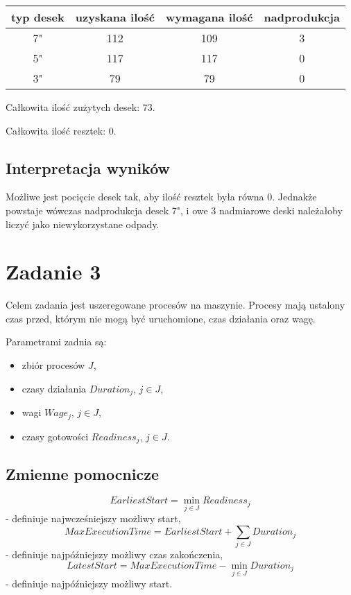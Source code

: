 \documentclass[polish,12pt,titlepage]{article}
\begin{document}
\begin{tabular}{ | c | c | c | c | }
	\hline
	typ desek & uzyskana ilość & wymagana ilość & nadprodukcja \\
	\hline
	7" & 112 & 109 & 3 \\
	5" & 117 & 117 & 0 \\
	3" & 79  & 79  & 0 \\
	\hline
\end{tabular}

Całkowita ilość zużytych desek: $73$.

Całkowita ilość resztek: $0$.



\subsection{Interpretacja wyników}

Możliwe jest pocięcie desek tak, aby ilość resztek była równa 0. Jednakże powstaje wówczas nadprodukcja desek 7", i owe 3 nadmiarowe deski należałoby liczyć jako niewykorzystane odpady.

\section{Zadanie 3}

Celem zadania jest uszeregowane procesów na maszynie. Procesy mają ustalony czas przed, którym nie mogą być uruchomione, czas działania oraz wagę.

Parametrami zadnia są:
\begin{itemize}
	\item zbiór procesów $J$,
	\item czasy działania $Duration_j$, $j \in J$,
	\item wagi $Wage_j$, $j \in J$,
	\item czasy gotowości $Readiness_j$, $j \in J$.
\end{itemize}

\subsection{Zmienne pomocnicze}

$$EarliestStart = \min_{j \in J} Readiness_j$$ - definiuje najwcześniejszy możliwy start,
$$MaxExecutionTime = EarliestStart + \sum\limits_{j \in J} Duration_j$$ - definiuje najpóźniejszy możliwy czas zakończenia,
$$LatestStart = MaxExecutionTime - \min_{j \in J} Duration_j$$ - definiuje najpóźniejszy możliwy start.
\end{document}
